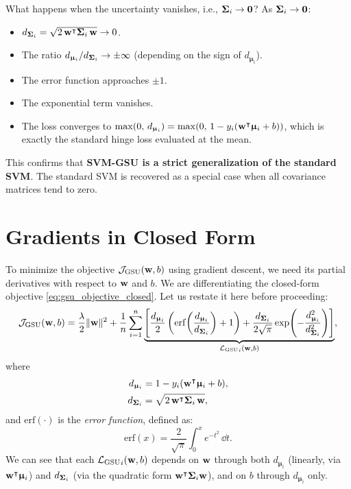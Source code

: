 \documentclass[11pt, letterpaper]{article}
\newcommand{\bSigma}{\vb{\Sigma}}
\newcommand{\bmu}{\boldsymbol{\upmu}}
\newcommand{\loss}{\mathcal{L}}
\newcommand{\obj}{\mathcal{J}}
\begin{document}
What happens when the uncertainty vanishes, i.e., $\bSigma_i \to \vb{0}$? As $\bSigma_i \to \vb{0}$:
\begin{itemize}[leftmargin=2em]
    \item $d_{\bSigma_i} = \sqrt{2\, \vb{w}^{\intercal} \bSigma_i\, \vb{w}} \to 0$.
    \item The ratio $d_{\bmu_i}/d_{\bSigma_i} \to \pm \infty$ (depending on the sign of $d_{\bmu_i}$).
    \item The error function approaches $\pm 1$.
    \item The exponential term vanishes.
    \item The loss converges to $\max(0,\, d_{\bmu_i}) = \max(0,\, 1 - y_i(\vb{w}^{\intercal} \bmu_i + b))$, which is exactly the standard hinge loss evaluated at the mean.
\end{itemize}
This confirms that \textbf{SVM-GSU is a strict generalization of the standard SVM}. The standard SVM is recovered as a special case when all covariance matrices tend to zero.

\section{Gradients in Closed Form}\label{sec:gsu_gradients}

To minimize the objective $\obj_{\text{GSU}} (\vb{w}, b)$ using gradient descent, we need its partial derivatives with respect to $\vb{w}$ and $b$. We are differentiating the closed-form objective \cref{eq:gsu_objective_closed}. Let us restate it here before proceeding:
\begin{equation}\label{eq:gsu_obj_restate}
    \obj_{\text{GSU}} (\vb{w}, b) = \frac{\lambda}{2}\|\vb{w}\|^2 + \frac{1}{n}\sum_{i=1}^{n}\underbrace{\left[\frac{d_{\bmu_i}}{2}\left(\mathrm{erf}\!\left(\frac{d_{\bmu_i}}{d_{\bSigma_i}}\right) + 1\right) + \frac{d_{\bSigma_i}}{2\sqrt{\pi}}\exp\!\left(-\frac{d_{\bmu_i}^2}{d_{\bSigma_i}^2}\right)\right]}_{{\loss_{\text{GSU}}}_{i}(\vb{w}, b)},
\end{equation}
where
\begin{align*}
    d_{\bmu_i} &= 1 - y_i(\vb{w}^{\intercal} \bmu_i + b), \\
    d_{\bSigma_i} &= \sqrt{2\, \vb{w}^{\intercal} \bSigma_i\, \vb{w}},
\end{align*}
and $\mathrm{erf}(\cdot)$ is the \emph{error function}, defined as:
\begin{equation*}
    \mathrm{erf}(x) = \frac{2}{\sqrt{\pi}} \int_0^x e^{-t^2}\, \dd{t}.
\end{equation*}
We can see that each ${\loss_{\text{GSU}}}_{i}(\vb{w}, b)$ depends on $\vb{w}$ through both $d_{\bmu_i}$ (linearly, via $\vb{w}^{\intercal}\bmu_i$) and $d_{\bSigma_i}$ (via the quadratic form $\vb{w}^{\intercal}\bSigma_i\vb{w}$), and on $b$ through $d_{\bmu_i}$ only.
\end{document}
